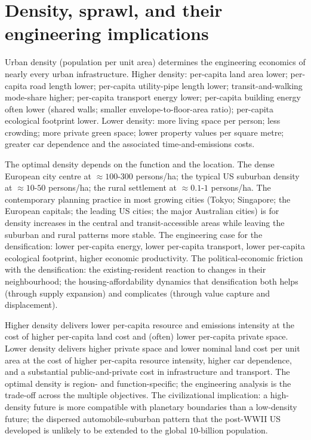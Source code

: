 \section{Density, sprawl, and their engineering implications}

Urban density (population per unit area) determines the engineering economics of nearly every urban infrastructure. Higher density: per-capita land area lower; per-capita road length lower; per-capita utility-pipe length lower; transit-and-walking mode-share higher; per-capita transport energy lower; per-capita building energy often lower (shared walls; smaller envelope-to-floor-area ratio); per-capita ecological footprint lower. Lower density: more living space per person; less crowding; more private green space; lower property values per square metre; greater car dependence and the associated time-and-emissions costs.

The optimal density depends on the function and the location. The dense European city centre at $\approx 100$-$300$ persons/ha; the typical US suburban density at $\approx 10$-$50$ persons/ha; the rural settlement at $\approx 0.1$-$1$ persons/ha. The contemporary planning practice in most growing cities (Tokyo; Singapore; the European capitals; the leading US cities; the major Australian cities) is for density increases in the central and transit-accessible areas while leaving the suburban and rural patterns more stable. The engineering case for the densification: lower per-capita energy, lower per-capita transport, lower per-capita ecological footprint, higher economic productivity. The political-economic friction with the densification: the existing-resident reaction to changes in their neighbourhood; the housing-affordability dynamics that densification both helps (through supply expansion) and complicates (through value capture and displacement).

\begin{archetype}
Higher density delivers lower per-capita resource and emissions intensity at the cost of higher per-capita land cost and (often) lower per-capita private space. Lower density delivers higher private space and lower nominal land cost per unit area at the cost of higher per-capita resource intensity, higher car dependence, and a substantial public-and-private cost in infrastructure and transport. The optimal density is region- and function-specific; the engineering analysis is the trade-off across the multiple objectives. The civilizational implication: a high-density future is more compatible with planetary boundaries than a low-density future; the dispersed automobile-suburban pattern that the post-WWII US developed is unlikely to be extended to the global $10$-billion population.
\end{archetype}

